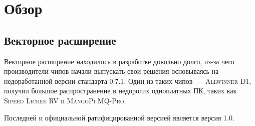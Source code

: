 
\section{Обзор}
\label{sec:relatedworks}
\subsection[Векторное расширение RISC-V]{Векторное расширение \riscv{}}
Векторное расширение \riscv{} находилось в разработке довольно долго, из-за чего производители чипов начали выпускать свои решения основываясь на недоработанной версии стандарта 0.7.1.
Один из таких чипов~--- \textsc{Allwinner D1}, получил большое распространение в недорогих одноплатных ПК, таких как \textsc{Sipeed Lichee RV} и \textsc{MangoPi MQ-Pro}.

Последней и официальной ратифицированной версией является версия 1.0.
